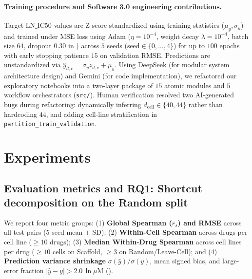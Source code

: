 \documentclass{article}
\begin{document}
\paragraph{Training procedure and Software 3.0 engineering contributions.}
Target $\text{LN\_IC50}$ values are Z-score standardized using training statistics ($\mu_y, \sigma_y$) and trained under MSE loss using Adam ($\eta = 10^{-4}$, weight decay $\lambda = 10^{-4}$, batch size $64$, dropout $0.30$ in ) across $5$ seeds ($\text{seed} \in \{0,\dots,4\}$) for up to $100$ epochs with early stopping patience $15$ on validation RMSE. Predictions are unstandardized via $\hat{y}_{d,c} = \sigma_y \hat{z}_{d,c} + \mu_y$. Using DeepSeek (for modular system architecture design) and Gemini (for code implementation), we refactored our exploratory notebooks into a two-layer package of $15$ atomic modules and $5$ workflow orchestrators (\texttt{src/}). Human verification resolved two AI-generated bugs during refactoring: dynamically inferring $d_{\text{cell}} \in \{40, 44\}$ rather than hardcoding $44$, and adding cell-line stratification in \texttt{partition\_train\_validation}.

\section{Experiments}
\label{sec:experiments}

\subsection{Evaluation metrics and RQ1: Shortcut decomposition on the Random split}
We report four metric groups: (1) \textbf{Global Spearman ($r_s$) and RMSE} across all test pairs ($5$-seed mean $\pm$ SD); (2) \textbf{Within-Cell Spearman} across drugs per cell line ($\ge 10$ drugs); (3) \textbf{Median Within-Drug Spearman} across cell lines per drug ($\ge 10$ cells on Scaffold, $\ge 3$ on Random/Leave-Cell); and (4) \textbf{Prediction variance shrinkage} $\sigma(\hat{y})/\sigma(y)$, mean signed bias, and large-error fraction $|\hat{y} - y| > 2.0\,\ln\mu\text{M}$ ().
\end{document}
